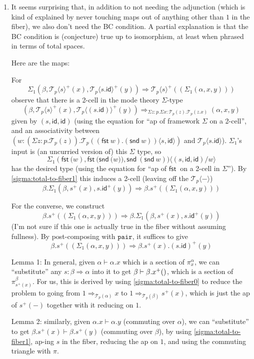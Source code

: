\documentclass[10pt]{article}
\theoremstyle{definition}
\newcommand\dsd[1]{\ensuremath{\mathsf{#1}}}
\newcommand{\tcell}{\Rightarrow}
\newcommand{\app}[2]{\ensuremath{#1 \: #2}}
\newcommand{\fst}[1]{\app{\dsd{fst}}{#1}}
\newcommand{\snd}[1]{\app{\dsd{snd}}{#1}}
\newcommand{\id}{\mathsf{id}}
\newcommand\TrPlus[2]{\ensuremath{{#1}^+(#2)}}
\newcommand\El[2]{\mathcal{T}_{#1}(#2)}
\newcommand\ApEl[2]{\mathcal{T}_{#1}\langle#2\rangle}
\newcommand\ap[2]{\ensuremath{#1 \langle #2 \rangle }}
\newcommand\mtt[1]{\mathtt{#1}}
\begin{document}
\begin{enumerate}
\item It seems surprising that, in addition to not needing the
  adjunction (which is kind of explained by never touching maps out of
  anything other than $1$ in the fiber), we also don't need the BC
  condition.  A partial explanation is that the BC condition is
  (conjecture) true up to isomorphism, at least when phrased in terms of
  total spaces.

  Here are the maps:

  For 
  \[
  \Sigma_1(\beta,\TrPlus{\ApEl{p}{s}}{x}, \TrPlus{\ApEl{p}{s.\id}}{y}) \tcell \TrPlus{\ApEl{p}{s}}{(\Sigma_1(\alpha,x,y))} 
  \]
  observe that there is a 2-cell in the mode theory $\Sigma$-type
  \[
  (\beta,\TrPlus{\ApEl{p}{s}}{x}, \TrPlus{\ApEl{p}{(s . \id)}}{y}) \tcell_{\Sigma z:p.\Sigma x:\El{p}{z}.\El{p}{z.x}} (\alpha,x,y)
  \]
  given by $(s, \id, \id)$ (using the equation for ``ap of framework
  $\Sigma$ on a 2-cell'', and an associativity between $(\ap{w:(\Sigma
    z:p.\El{p}{z}).\El{p}{(\fst w).(\snd w)}}{s , \id})$ and
  $\ApEl{p}{s.\id}$).  $\Sigma_1$'s input is (an uncurried version of)
  this $\Sigma$ type, so
  \[
  \ap{\Sigma_1 (\fst(w), \fst({\snd (w)}), \snd{(\snd w)})}{(s, \id, \id)/w}
  \]
  has the desired type (using the equation for ``ap of \fst{} on a
  2-cell in $\Sigma$'').
  By \ref{sigma:total-to-fiber1} this induces a 2-cell (leaving off the $\ApEl{p}{-}$)
  \[
  \beta.\Sigma_1(\beta,\TrPlus{s}{x}, \TrPlus{s.\id}{y}) \tcell \beta.\TrPlus{s}{(\Sigma_1(\alpha,x,y))} 
  \]

  For the converse, we construct 
  \[
  \beta.\TrPlus{s}{(\Sigma_1(\alpha,x,y))} \tcell \beta.\Sigma_1(\beta,\TrPlus{s}{x}, \TrPlus{s.\id}{y}) 
  \]
  (I'm not sure if this one is actually true in the fiber without
  assuming fullness).
  By post-composing with $\mtt{pair}$, it suffices to give 
  \[
  \beta.\TrPlus{s}{(\Sigma_1(\alpha,x,y))} \tcell \beta.\TrPlus{s}{x}.\TrPlus{(s.\id)}{y}
  \]

  Lemma 1: In general, given $\alpha \vdash \alpha.x$ which is a section
  of $\pi^\alpha_x$, we can ``substitute'' any $s : \beta \tcell \alpha$
  into it to get $\beta \vdash \beta.\TrPlus{x}$, which is a section of
  $\pi^\beta_{\TrPlus{s}{x}}$.  For us, this is derived by using
  \ref{sigma:total-to-fiber0} to reduce the problem to going from $1
  \tcell_{\El{p}{\alpha}} x$ to $1 \tcell_{\El{p}{\beta}}
  \TrPlus{s}{x}$, which is just the ap of ${\TrPlus{s}{-}}$ together
  with it reducing on $1$.

  Lemma 2: similarly, given $\alpha.x \vdash \alpha.y$ (commuting over
  $\alpha$), we can ``substitute'' to get $\beta.\TrPlus{s}{x} \vdash
  \beta.\TrPlus{s}{y}$ (commuting over $\beta$), by using
  \ref{sigma:total-to-fiber1}, ap-ing $s$ in the fiber, reducing the ap
  on $1$, and using the commuting triangle with $\pi$.


\end{enumerate}
\end{document}
